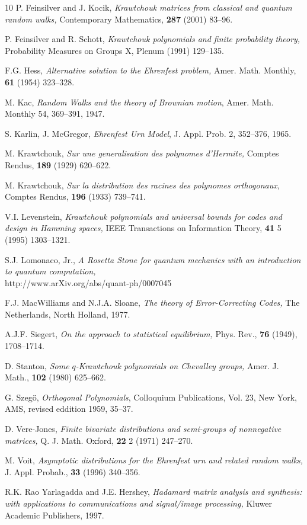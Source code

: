 \documentclass[12pt]{article}
\numberwithin{equation}{section}
\begin{document}
\begin{thebibliography}{10}
P. Feinsilver and J. Kocik,
\emph{Krawtchouk matrices from classical and quantum random walks,}
{Contemporary Mathematics}, {\bf 287} (2001) 83--96. 

P. Feinsilver and R. Schott,
\emph{Krawtchouk polynomials and finite probability theory,}
{Probability Measures on Groups X}, Plenum (1991)  129--135.

F.G. Hess,
\emph{Alternative solution to the Ehrenfest problem,}
Amer. Math. Monthly, {\bf 61} (1954) 323--328.

M. Kac,
\emph{Random Walks and the theory of Brownian motion},
Amer. Math. Monthly 54, 369--391, 1947.


S. Karlin, J. McGregor,
\emph{Ehrenfest Urn Model},
J. Appl. Prob. 2, 352--376, 1965.

M. Krawtchouk,
\emph{Sur une generalisation des polynomes d'Hermite,}
{Comptes Rendus}, {\bf 189} (1929) 620--622.

M. Krawtchouk, 
\emph{Sur la distribution des racines des polynomes orthogonaux,}
{Comptes Rendus}, {\bf 196} (1933) 739--741.

V.I. Levenstein,
\emph{Krawtchouk polynomials and universal bounds for codes and design in
Hamming spaces,}
{IEEE Transactions on Information Theory}, {\bf 41} 5 (1995)  
1303--1321.

S.J. Lomonaco, Jr., 
\emph{A Rosetta Stone for quantum mechanics with an introduction
to quantum computation,}\\
http://www.arXiv.org/abs/quant-ph/0007045


F.J. MacWilliams and N.J.A. Sloane, 
\emph{The theory of Error-Correcting Codes,}
The Netherlands, North Holland, 1977.

A.J.F. Siegert, 
\emph{On the approach to statistical equilibrium,}
Phys. Rev., {\bf 76}  (1949), 1708--1714.

D. Stanton,
\emph{Some $q$-Krawtchouk polynomials on Chevalley groups,}
Amer. J. Math., {\bf 102} (1980) 625--662.

G. Szeg\"o,
{\sl Orthogonal Polynomials}, 
Colloquium Publications, Vol. 23, New York, AMS, revised eddition 1959,
35--37.

D. Vere-Jones,
\emph{Finite bivariate distributions and semi-groups of nonnegative matrices,}
{Q. J. Math. Oxford}, {\bf 22} 2 (1971)
247--270.

M. Voit,
\emph{Asymptotic distributions for the Ehrenfest urn 
       and related random walks,}
{J. Appl. Probab.},  {\bf 33} (1996) 340--356. 

 R.K. Rao Yarlagadda and J.E. Hershey,
\emph{Hadamard matrix analysis and synthesis: with applications
to communications and signal/image processing,}
Kluwer Academic Publishers, 1997.

\end{thebibliography}
\end{document}
